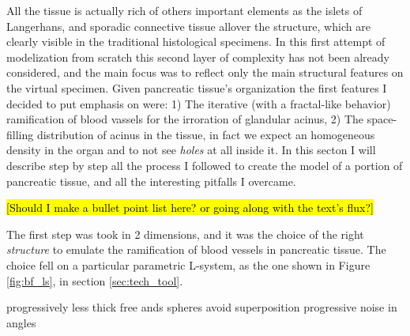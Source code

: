 All the tissue is actually rich of others important elements as the islets of Langerhans, and sporadic connective tissue allover the structure, which are clearly visible in the traditional histological specimens. In this first attempt of modelization from scratch this second layer of complexity has not been already considered, and the main focus was to reflect only the main structural features on the virtual specimen. Given pancreatic tissue's organization the first features I decided to put emphasis on were: 1) The iterative (with a fractal-like behavior) ramification of blood vassels for the irroration of glandular acinus, 2) The space-filling distribution of acinus in the tissue, in fact we expect an homogeneous density in the organ and to not see \textit{holes} at all inside it. In this secton I will describe step by step all the process I followed to create the model of a portion of pancreatic tissue, and all the interesting pitfalls I overcame.

\hl{[Should I make a bullet point list here? or going along with the text's flux?]}

The first step was took in 2 dimensions, and it was the choice of the right \textit{structure} to emulate the ramification of blood vessels in pancreatic tissue. The choice fell on a particular parametric L-system, as the one shown in Figure \ref{fig:bf_ls}, in section \ref{sec:tech_tool}.

progressively less thick
free ands spheres
avoid superposition
progressive noise in angles


\clearpage
